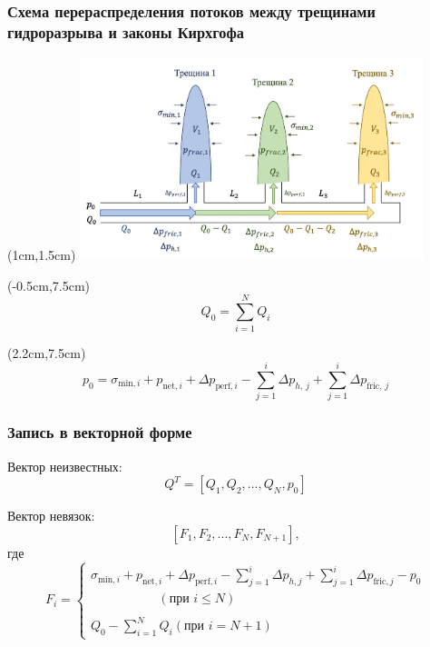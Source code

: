 \documentclass{beamer}
\begin{document}
\begin{frame}
\frametitle{Схема перераспределения потоков между трещинами гидроразрыва и законы Кирхгофа}

\begin{textblock*}{11cm}(1cm,1.5cm)
\includegraphics[width=10cm]{flow_distribution_scheme.jpg}
\end{textblock*}

\begin{textblock*}{4cm}(-0.5cm,7.5cm)
$$\boxed{Q_0=\sum\limits_{i=1}^{N}Q_i}$$
\end{textblock*}

\begin{textblock*}{11cm}(2.2cm,7.5cm)
$$\boxed{p_0=\sigma_{\text{min},i}+p_{\text{net},i}+\Delta p_{\text{perf},i}-\sum_{j=1}^{i}{\Delta p_{h,\,j}}+\sum_{j=1}^{i}\Delta p_{\text{fric},\,j}}$$
\end{textblock*}

\end{frame}


\begin{frame}
\frametitle{Запись в векторной форме}

Вектор неизвестных:
$$Q^T=\left[Q_1,Q_2,...,Q_N,p_0\right]$$

Вектор невязок:
$$\left[F_1,F_2,...,F_N,F_{N+1}\right],$$
где
$$
F_i=
\begin{cases}
\sigma_{\text{min},i}+p_{\text{net},i}+\Delta p_{\text{perf},i}-\sum\limits_{j=1}^{i}{\Delta p_{h,j}}+\sum\limits_{j=1}^{i}{\Delta p_{\text{fric},j}}-p_0\\\,\,\,\,\,\,\,\,\,\,\,\,\,\,\,\,\,\,\,\,\,\,\,\,\,\,\,\,\,\,\,\,\left(\text{при }i\leqslant N\right)\\\ \\
Q_0-\sum\limits_{i=1}^{N}{Q_i}\left(\text{при }i=N+1\right)
\end{cases}
$$

\end{frame}
\end{document}
